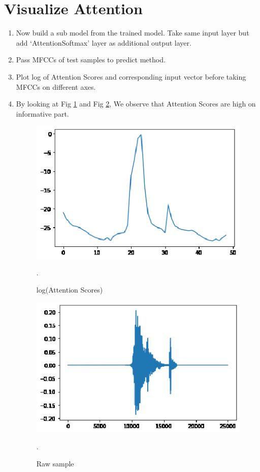 \documentclass[11pt,english]{article}
\begin{document}
\section{Visualize Attention}
\begin{enumerate}
    \item Now build a sub model from the trained model. Take same input layer but add ‘AttentionSoftmax’ layer as additional output layer.
    \item Pass MFCCs of test samples to predict method.
    \item Plot log of Attention Scores and corresponding input vector before taking MFCCs on different axes.
    \item By looking at Fig \ref{fig: Attention} and Fig \ref{fig: Sample}, We observe that Attention Scores are high on informative part.
    \begin{figure}[!ht]
    \centering
    \includegraphics[width=\columnwidth]{./Figs/attention.eps}
    \caption{ log(Attention Scores)}.
    \label{fig: Attention}	
    \end{figure}
    \begin{figure}[!ht]
    \centering
    \includegraphics[width=\columnwidth]{./Figs/sample.eps}
    \caption{ Raw sample}.
    \label{fig: Sample}	
    \end{figure}
    
\end{enumerate}
\end{document}
